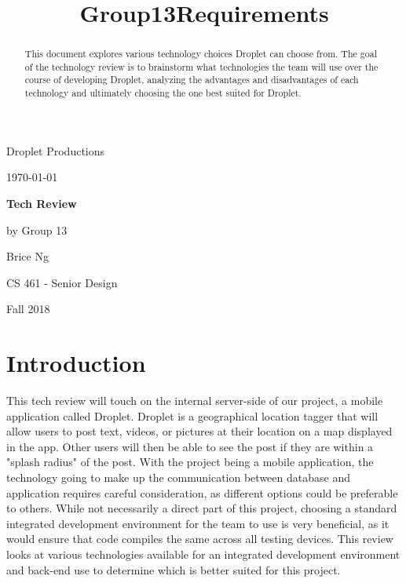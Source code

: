 \documentclass[draftclsnofoot, onecolumn, letterpaper,10pt,compsoc]{IEEEtran}
\title{Group13Requirements}
\def \TitlePageHeader{Droplet Productions}
\def \TitlePageTitle{Tech Review}
\def \GroupNumber{by Group 13}
\def \GroupMembers{Brice Ng}
\def \CourseTitle{CS 461 - Senior Design}
\def \CourseTerm{Fall 2018}
\newcommand{\NameSigPair}[1]{\par
\makebox[2.75in][r]{#1} \hfil 	\makebox[3.25in]{\makebox[2.25in]{\hrulefill} \hfill		\makebox[.75in]{\hrulefill}}
\par\vspace{-12pt} \textit{\tiny\noindent
\makebox[2.75in]{} \hfil		\makebox[3.25in]{\makebox[2.25in][r]{Signature} \hfill	\makebox[.75in][r]{Date}}}}
\renewcommand{\NameSigPair}[1]{#1}
\begin{document}
\begin{titlepage}
    \begin{singlespace}
        \hfill    
        \par\vspace{.2in}
        \centering
        \scshape{
            \huge \TitlePageHeader \par
            {\large\today}\par
            \vspace{.5in}
            \textbf{\Huge \TitlePageTitle }\par
            \vfill
            \vspace{5pt}

            \vspace{5pt}
            {\Large
                \NameSigPair{\GroupNumber}\par
            	\NameSigPair{\GroupMembers}\par
                \NameSigPair{\CourseTitle}\par
                \NameSigPair{\CourseTerm}\par
            }
            \vspace{20pt}
        }
    \end{singlespace}
    \begin{abstract}
    This document explores various technology choices Droplet can choose from.  The goal of the technology review is to brainstorm what technologies the team will use over the course of developing Droplet, analyzing the advantages and disadvantages of each technology and ultimately choosing the one best suited for Droplet.
    \end{abstract}
\end{titlepage}

\newpage
{}
\clearpage

\pagebreak

\section{Introduction}
This tech review will touch on the internal server-side of our project, a mobile application called Droplet.  Droplet is a geographical location tagger that will allow users to post text, videos, or pictures at their location on a map displayed in the app.  Other users will then be able to see the post if they are within a "splash radius" of the post.  With the project being a mobile application, the technology going to make up the communication between database and application requires careful consideration, as different options could be preferable to others.  While not necessarily a direct part of this project, choosing a standard integrated development environment for the team to use is very beneficial, as it would ensure that code compiles the same across all testing devices.  This review looks at various technologies available for an integrated development environment and back-end use to determine which is better suited for this project.
\end{document}
